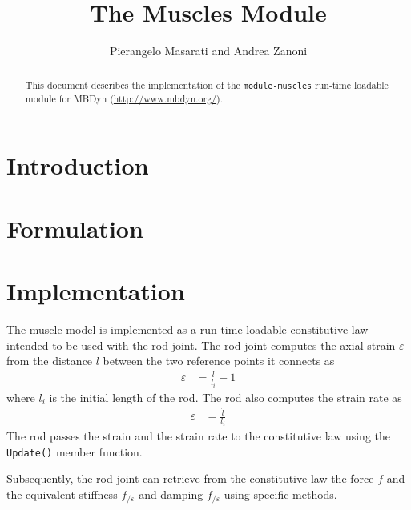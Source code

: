 \documentclass{article}
\begin{document}
\title{The Muscles Module}
\author{Pierangelo Masarati and Andrea Zanoni}
\date{}
\maketitle

\begin{abstract}
This document describes the implementation of the \texttt{module-muscles}
run-time loadable module for MBDyn (\url{http://www.mbdyn.org/}).
\end{abstract}

\section{Introduction}



\section{Formulation}



\section{Implementation}
The muscle model is implemented as a run-time loadable constitutive law
intended to be used with the rod joint.
The rod joint computes the axial strain $\varepsilon$
from the distance $l$ between the two reference points it connects as
\begin{align}
	\varepsilon
	&=
	\frac{l}{l_i} - 1
\end{align}
where $l_i$ is the initial length of the rod.
The rod also computes the strain rate as
\begin{align}
	\dot{\varepsilon}
	&=
	\frac{\dot{l}}{l_i}
\end{align}
The rod passes the strain and the strain rate to the constitutive law
using the \texttt{Update()} member function.

Subsequently, the rod joint can retrieve from the constitutive law
the force $f$ and the equivalent stiffness $f_{/\varepsilon}$
and damping $f_{/\dot{\varepsilon}}$ using specific methods.
\end{document}
